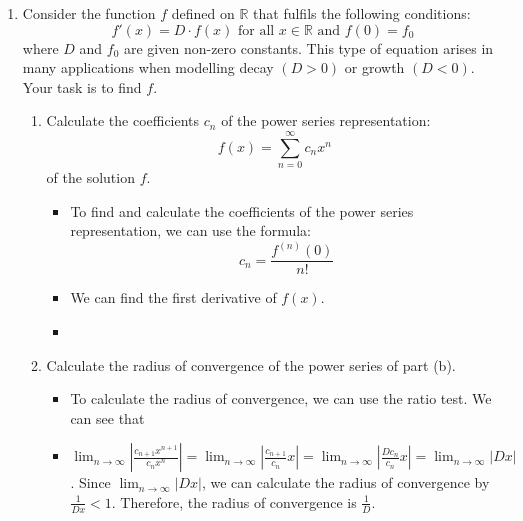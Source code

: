 \documentclass[12pt]{article}
\begin{document}
\begin{enumerate}[leftmargin=\labelsep]
    \item Consider the function $f$ defined on $\mathbb{R}$ that fulfils the following conditions:
    \begin{equation*}
        f'(x) = D \cdot f(x) \text{ for all } x \in \mathbb{R} \text{ and } f(0) = f_0
    \end{equation*}
    where $D$ and $f_0$ are given non-zero constants. This type of equation arises in many applications when modelling decay $(D>0)$ or growth $(D<0)$. Your task is to find $f$.
    
    
    \begin{enumerate}
        \item Calculate the coefficients $c_n$ of the power series representation:
        \begin{equation*}
            f(x) = \sum_{n=0}^{\infty} c_n x^n
        \end{equation*}
        of the solution $f$.
        \begin{itemize}[label={}]
            \item To find and calculate the coefficients of the power series representation, we can use the formula:
            \begin{equation*}
                c_n = \frac{f^{(n)}(0)}{n!}
            \end{equation*}
            \item We can find the first derivative of $f(x)$.
            \item 
        \end{itemize}


        \item Calculate the radius of convergence of the power series of part (b).
        \begin{itemize}[label={}]
            \item To calculate the radius of convergence, we can use the ratio test. We can see that
            \item $\displaystyle{\lim_{n \to \infty} \left| \frac{c_{n+1} x^{n+1}}{c_n x^n} \right| = \lim_{n \to \infty} \left| \frac{c_{n+1}}{c_n} x \right| = \lim_{n \to \infty} \left| \frac{D c_n}{c_n} x \right| = \lim_{n \to \infty} \left| D x \right|}$. Since $\displaystyle{\lim_{n \to \infty} \left| D x \right|}$, we can calculate the radius of convergence by $\displaystyle{\frac{1}{D x} < 1}$. Therefore, the radius of convergence is $\displaystyle{\frac{1}{D}}$.
        \end{itemize}


\end{enumerate}
\end{enumerate}
\end{document}
